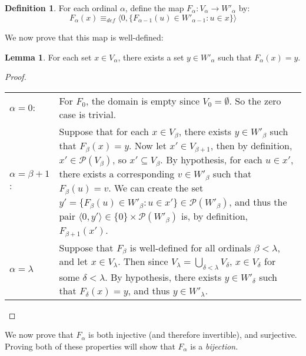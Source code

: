 \documentclass[11pt]{report}
\newcommand{\eqdef}{\equiv_\mathit{def}}
\newcommand{\pair}[2]{\langle #1,#2 \rangle}
\theoremstyle{definition}
\theoremstyle{theorem}
\theoremstyle{lemma}
\newtheorem{definition}{Definition}[section]
\newtheorem{lemma}[theorem]{Lemma}
\begin{document}
\begin{definition}
For each ordinal $\alpha$, define the map $F_\alpha:V_\alpha \to W'_\alpha$ by:
$$F_\alpha(x) \eqdef \pair{0}{\{F_{\alpha-1}(u)\in W'_{\alpha-1}: u\in x\}}$$
\end{definition}
\noindent
We now prove that this map is well-defined:
\begin{lemma}
For each set $x\in V_\alpha$, there exists a set $y\in W'_\alpha$ such that $F_\alpha(x)=y$.
\begin{proof} \hspace{1mm}\\
  \begin{tabular}{p{20mm} p{10cm}}
    $\alpha = 0$: \rule{0pt}{4ex} &
    For $F_0$, the domain is empty since $V_0 = \emptyset$. So the zero case is trivial.
    \\
    $\alpha = \beta+1$: \rule{0pt}{4ex} &
    Suppose that for each $x\in V_\beta$, there exists $y\in W'_\beta$ such that $F_\beta(x) = y$. Now let $x'\in V_{\beta+1}$, then by definition, $x'\in\mathcal{P}(V_\beta)$, so $x'\subseteq V_\beta$. By hypothesis, for each $u\in x'$, there exists a corresponding $v\in W'_\beta$ such that $F_\beta(u) = v$. We can create the set $y'= \{F_\beta(u)\in W'_\beta : u\in x'\}\in \mathcal{P}(W'_\beta)$,
    and thus the pair $\pair{0}{y'} \in \{0\}\times \mathcal{P}(W'_\beta)$ is, by definition, $F_{\beta+1}(x')$.
    \\
    $\alpha = \lambda$ \rule{0pt}{4ex} &
    Suppose that $F_\beta$ is well-defined for all ordinals $\beta<\lambda$, and let $x\in V_\lambda$. Then since $V_\lambda = \bigcup_{\delta<\lambda}V_\delta$, $x\in V_\delta$ for some $\delta<\lambda$. By hypothesis, there exists $y\in W'_\delta$ such that $F_\delta(x)=y$, and thus $y\in W'_\lambda$.
  \end{tabular}
\end{proof}
\end{lemma}
\noindent
We now prove that $F_\alpha$ is both injective (and therefore invertible), and surjective. Proving both of these properties will show that $F_\alpha$ is a \emph{bijection}.
\end{document}

